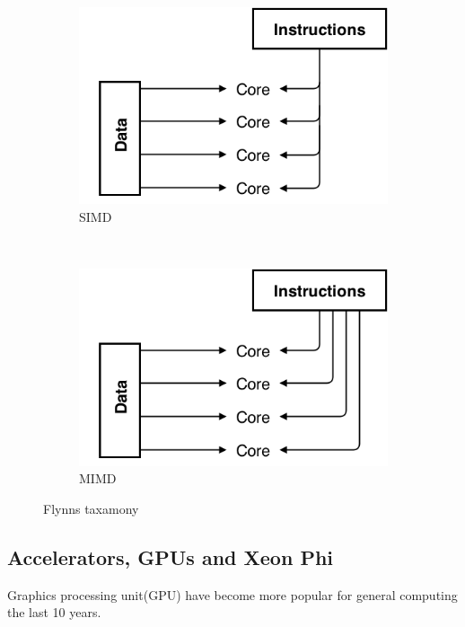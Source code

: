 \documentclass[10pt,a4paper]{report}
\begin{document}
\begin{figure}
        \begin{subfigure}[b]{0.4\textwidth}
                \includegraphics[width=\textwidth]{SIMD}
                \caption{SIMD}
                \label{fig:SIMD}
        \end{subfigure}
        ~
        \begin{subfigure}[b]{0.4\textwidth}
                \includegraphics[width=\textwidth]{MIMD}
                \caption{MIMD}
                \label{fig:MIMD}
        \end{subfigure}
        \caption{Flynns taxamony}\label{fig:flynn}
\end{figure}

\cite{introduction_hpc_hager}

\subsection{Accelerators, GPUs and Xeon Phi}
Graphics processing unit(GPU) have become more popular for general computing the last 10 years.
\end{document}
